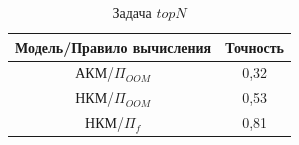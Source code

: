 \begin{table}[htb]
	\caption{Задача $topN$}
  \begin{center}
	\label{table:topn}
	\begin{tabular}{|c|c|}
	  \hline
		Модель/Правило вычисления & Точность \\ \hline
		АКМ/$\Pi_{OOM}$&0,32 \\ \hline
		НКМ/$\Pi_{OOM}$&0,53 \\ \hline
		НКМ/$\Pi_{f}$&0,81 \\ \hline
	\end{tabular}
  \end{center}
\end{table}

